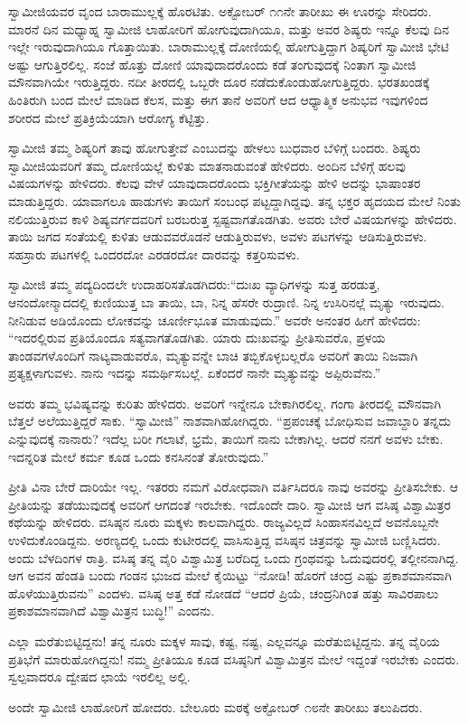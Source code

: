  ಸ್ವಾಮೀಜಿಯವರ ವೃಂದ ಬಾರಾಮುಲ್ಲಕ್ಕೆ ಹೊರಟಿತು. ಅಕ್ಟೋಬರ್ ೧೧ನೇ ತಾರೀಖು ಈ ಊರನ್ನು ಸೇರಿದರು. ಮಾರನೆ ದಿನ ಮಧ್ಯಾಹ್ನ ಸ್ವಾಮೀಜಿ ಲಾಹೋರಿಗೆ ಹೋಗುವುದಾಗಿಯೂ, ಮತ್ತು ಅವರ ಶಿಷ್ಯರು ಇನ್ನೂ ಕೆಲವು ದಿನ ಇಲ್ಲೇ ಇರುವುದಾಗಿಯೂ ಗೊತ್ತಾಯಿತು. ಬಾರಾಮುಲ್ಲಕ್ಕೆ ದೋಣಿಯಲ್ಲಿ ಹೋಗುತ್ತಿದ್ದಾಗ ಶಿಷ್ಯರಿಗೆ ಸ್ವಾಮೀಜಿ ಭೇಟಿ ಅಷ್ಟು ಆಗುತ್ತಿರಲಿಲ್ಲ. ಸಂಜೆ ಹೊತ್ತು ದೋಣಿ ಯಾವುದಾದರೊಂದು ಕಡೆ ತಂಗುವುದಕ್ಕೆ ನಿಂತಾಗ ಸ್ವಾಮೀಜಿ ಮೌನವಾಗಿಯೇ ಇರುತ್ತಿದ್ದರು. ನದೀ ತೀರದಲ್ಲಿ ಒಬ್ಬರೇ ದೂರ ನಡೆದುಕೊಂಡುಹೋಗುತ್ತಿದ್ದರು. ಭರತಖಂಡಕ್ಕೆ ಹಿಂತಿರುಗಿ ಬಂದ ಮೇಲೆ ಮಾಡಿದ ಕೆಲಸ, ಮತ್ತು ಈಗ ತಾನೆ ಅವರಿಗೆ ಆದ ಆಧ್ಯಾತ್ಮಿಕ ಅನುಭವ ಇವುಗಳಿಂದ ಶರೀರದ ಮೇಲೆ ಪ್ರತಿಕ್ರಿಯೆಯಾಗಿ ಆರೋಗ್ಯ ಕೆಟ್ಟಿತ್ತು. 

 ಸ್ವಾಮೀಜಿ ತಮ್ಮ ಶಿಷ್ಯರಿಗೆ ತಾವು ಹೋಗುತ್ತೇವೆ ಎಂಬುದನ್ನು ಹೇಳಲು ಬುಧವಾರ ಬೆಳಿಗ್ಗೆ ಬಂದರು. ಶಿಷ್ಯರು ಸ್ವಾಮೀಜಿಯವರಿಗೆ ತಮ್ಮ ದೋಣಿಯಲ್ಲೆ ಕುಳಿತು ಮಾತನಾಡುವಂತೆ ಹೇಳಿದರು. ಅಂದಿನ ಬೆಳಿಗ್ಗೆ ಹಲವು ವಿಷಯಗಳನ್ನು ಹೇಳಿದರು. ಕೆಲವು ವೇಳೆ ಯಾವುದಾದರೊಂದು ಭಕ್ತಿಗೀತೆಯನ್ನು ಹೇಳಿ ಅದನ್ನು ಭಾಷಾಂತರ ಮಾಡುತ್ತಿದ್ದರು. ಯಾವಾಗಲೂ ಹಾಡುಗಳು ತಾಯಿಗೆ ಸಂಬಂಧ ಪಟ್ಟದ್ದಾಗಿದ್ದವು. ತನ್ನ ಭಕ್ತರ ಹೃದಯದ ಮೇಲೆ ನಿಂತು ನಲಿಯುತ್ತಿರುವ ಕಾಳಿ ಶಿಷ್ಯವರ್ಗದವರಿಗೆ ಬರಬರುತ್ತ ಸ್ಪಷ್ಟವಾಗತೊಡಗಿತು. ಅವರು ಬೇರೆ ವಿಷಯಗಳನ್ನು ಹೇಳಿದರು. ತಾಯಿ ಜಗದ ಸಂತೆಯಲ್ಲಿ ಕುಳಿತು ಆಡುವವರೊಡನೆ ಆಡುತ್ತಿರುವಳು, ಅವಳು ಪಟಗಳನ್ನು ಆಡಿಸುತ್ತಿರುವಳು. ಸಹಸ್ರಾರು ಪಟಗಳಲ್ಲಿ ಒಂದರದೋ ಎರಡರದೋ ದಾರವನ್ನು ಕತ್ತರಿಸುವಳು. 

 ಸ್ವಾಮೀಜಿ ತಮ್ಮ ಪದ್ಯದಿಂದಲೇ ಉದಾಹರಿಸತೊಡಗಿದರು:“ದುಃಖ ವ್ಯಾಧಿಗಳನ್ನು ಸುತ್ತ ಹರಡುತ್ತ, ಆನಂದೋನ್ಮಾದದಲ್ಲಿ ಕುಣಿಯುತ್ತ ಬಾ ತಾಯಿ, ಬಾ, ನಿನ್ನ ಹೆಸರೇ ರುದ್ರಾಣಿ. ನಿನ್ನ ಉಸಿರಿನಲ್ಲೆ ಮೃತ್ಯು ಇರುವುದು. ನೀನಿಡುವ ಅಡಿಯೊಂದು ಲೋಕವನ್ನು ಚೂರ್ಣೀಭೂತ ಮಾಡುವುದು.” ಅವರೇ ಅನಂತರ ಹೀಗೆ ಹೇಳಿದರು: “ಇದರಲ್ಲಿರುವ ಪ್ರತಿಯೊಂದೂ ಸತ್ಯವಾಗತೊಡಗಿತು. ಯಾರು ದುಃಖವನ್ನು ಪ್ರೀತಿಸುವರೊ, ಪ್ರಳಯ ತಾಂಡವಗಳೊಂದಿಗೆ ನಾಟ್ಯವಾಡುವರೊ, ಮೃತ್ಯುವನ್ನೇ ಬಾಚಿ ತಬ್ಬಿಕೊಳ್ಳಬಲ್ಲರೊ ಅವರಿಗೆ ತಾಯಿ ನಿಜವಾಗಿ ಪ್ರತ್ಯಕ್ಷಳಾಗುವಳು. ನಾನು ಇದನ್ನು ಸಮರ್ಥಿಸಬಲ್ಲೆ. ಏಕೆಂದರೆ ನಾನೇ ಮೃತ್ಯುವನ್ನು ಅಪ್ಪಿರುವೆನು.” 

 ಅವರು ತಮ್ಮ ಭವಿಷ್ಯವನ್ನು ಕುರಿತು ಹೇಳಿದರು. ಅವರಿಗೆ ಇನ್ನೇನೂ ಬೇಕಾಗಿರಲಿಲ್ಲ. ಗಂಗಾ ತೀರದಲ್ಲಿ ಮೌನವಾಗಿ ಬೆತ್ತಲೆ ಅಲೆಯುತ್ತಿದ್ದರೆ ಸಾಕು. “ಸ್ವಾಮೀಜಿ” ನಾಶವಾಗಿಹೋಗಿದ್ದರು. “ಪ್ರಪಂಚಕ್ಕೆ ಬೋಧಿಸುವ ಜವಾಬ್ದಾರಿ ತನ್ನದು ಎನ್ನುವುದಕ್ಕೆ ನಾನಾರು? ಇದೆಲ್ಲ ಬರೀ ಗಲಾಟೆ, ಭ್ರಮೆ, ತಾಯಿಗೆ ನಾನು ಬೇಕಾಗಿಲ್ಲ. ಆದರೆ ನನಗೆ ಅವಳು ಬೇಕು. ಇದನ್ನರಿತ ಮೇಲೆ ಕರ್ಮ ಕೂಡ ಒಂದು ಕನಸಿನಂತೆ ತೋರುವುದು.” 

 ಪ್ರೀತಿ ವಿನಾ ಬೇರೆ ದಾರಿಯೇ ಇಲ್ಲ. ಇತರರು ನಮಗೆ ವಿರೋಧವಾಗಿ ವರ್ತಿಸಿದರೂ ನಾವು ಅವರನ್ನು ಪ್ರೀತಿಸಬೇಕು. ಆ ಪ್ರೀತಿಯನ್ನು ತಡೆಯುವುದಕ್ಕೆ ಅವರಿಗೆ ಆಗದಂತೆ ಇರಬೇಕು. ಇದೊಂದೇ ದಾರಿ. ಸ್ವಾಮೀಜಿ ಆಗ ವಸಿಷ್ಠ ವಿಶ್ವಾಮಿತ್ರರ ಕಥೆಯನ್ನು ಹೇಳಿದರು. ವಸಿಷ್ಠನ ನೂರು ಮಕ್ಕಳು ಕಾಲವಾಗಿದ್ದರು. ರಾಜ್ಯವಿಲ್ಲದೆ ಸಿಂಹಾಸನವಿಲ್ಲದೆ ಅವನೊಬ್ಬನೇ ಉಳಿದುಕೊಂಡಿದ್ದನು. ಅರಣ್ಯದಲ್ಲಿ ಒಂದು ಕುಟೀರದಲ್ಲಿ ವಾಸಿಸುತ್ತಿದ್ದ ವಸಿಷ್ಠನ ಚಿತ್ರವನ್ನು ಸ್ವಾಮೀಜಿ ಬಣ್ಣಿಸಿದರು. ಅಂದು ಬೆಳದಿಂಗಳ ರಾತ್ರಿ. ವಸಿಷ್ಠ ತನ್ನ ವೈರಿ ವಿಶ್ವಾಮಿತ್ರ ಬರೆದಿದ್ದ ಒಂದು ಗ್ರಂಥವನ್ನು ಓದುವುದರಲ್ಲಿ ತಲ್ಲೀನನಾಗಿದ್ದ. ಆಗ ಅವನ ಹೆಂಡತಿ ಬಂದು ಗಂಡನ ಭುಜದ ಮೇಲೆ ಕೈಯಿಟ್ಟು “ನೋಡಿ! ಹೊರಗೆ ಚಂದ್ರ ಎಷ್ಟು ಪ್ರಕಾಶಮಾನವಾಗಿ ಹೊಳೆಯುತ್ತಿರುವನು” ಎಂದಳು. ವಸಿಷ್ಠ ಅತ್ತ ಕಡೆ ನೋಡದೆ “ಆದರೆ ಪ್ರಿಯೆ, ಚಂದ್ರನಿಗಿಂತ ಹತ್ತು ಸಾವಿರಪಾಲು ಪ್ರಕಾಶಮಾನವಾಗಿದೆ ವಿಶ್ವಾಮಿತ್ರನ ಬುದ್ಧಿ!” ಎಂದನು. 

 ಎಲ್ಲಾ ಮರೆತುಬಿಟ್ಟಿದ್ದನು! ತನ್ನ ನೂರು ಮಕ್ಕಳ ಸಾವು, ಕಷ್ಟ, ನಷ್ಟ, ಎಲ್ಲವನ್ನೂ ಮರೆತುಬಿಟ್ಟಿದ್ದನು. ತನ್ನ ವೈರಿಯ ಪ್ರತಿಭೆಗೆ ಮಾರುಹೋಗಿದ್ದನು! ನಮ್ಮ ಪ್ರೀತಿಯೂ ಕೂಡ ವಸಿಷ್ಠನಿಗೆ ವಿಶ್ವಾಮಿತ್ರನ ಮೇಲೆ ಇದ್ದಂತೆ ಇರಬೇಕು ಎಂದರು. ಸ್ವಲ್ಪವಾದರೂ ದ್ವೇಷದ ಛಾಯೆ ಇರಲಿಲ್ಲ ಅಲ್ಲಿ. 

 ಅಂದೇ ಸ್ವಾಮೀಜಿ ಲಾಹೋರಿಗೆ ಹೋದರು. ಬೇಲೂರು ಮಠಕ್ಕೆ ಅಕ್ಟೋಬರ್ ೧೮ನೇ ತಾರೀಖು ತಲುಪಿದರು. 

